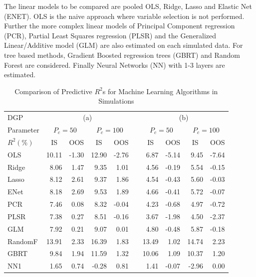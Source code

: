 \documentclass[]{article}
\begin{document}
The linear models to be compared are pooled OLS, Ridge, Lasso and
Elastic Net (ENET). OLS is the naive approach where variable selection
is not performed. Further the more complex linear models of Principal
Component regression (PCR), Partial Least Squares regression (PLSR) and
the Generalized Linear/Additive model (GLM) are also estimated on each
simulated data. For tree based methods, Gradient Boosted regression
trees (GBRT) and Random Forest are considered. Finally Neural Networks
(NN) with 1-3 layers are estimated.

\begin{table}[ht]
\begin{threeparttable}
\centering
\setlength{\tabcolsep}{12pt}
\caption{Comparison of Predictive $R^2$s for Machine Learning Algorithms in Simulations}
\begin{tabular}{lrrrrcrrrr}
DGP & \multicolumn{4}{c}{(a)} && \multicolumn{4}{c}{(b)} \\
  \Xhline{2\arrayrulewidth}\noalign{\smallskip}
Parameter & \multicolumn{2}{c}{$P_c = 50$} & \multicolumn{2}{c}{$P_c = 100$}& & \multicolumn{2}{c}{$P_c = 50$} &  \multicolumn{2}{c}{$P_c = 100$} \\
  \noalign{\smallskip}\hline\noalign{\smallskip}
$R^2(\%)$ & \multicolumn{1}{c}{IS} & \multicolumn{1}{c}{OOS} & \multicolumn{1}{c}{IS} & \multicolumn{1}{c}{OOS} & &\multicolumn{1}{c}{IS} & \multicolumn{1}{c}{OOS} & \multicolumn{1}{c}{IS} & \multicolumn{1}{c}{OOS} \\ 
  \noalign{\smallskip}\hline\noalign{\smallskip}
OLS & 10.11 & -1.30 & 12.90 & -2.76 && 6.87 & -5.14 & 9.45 & -7.64 \\ 
Ridge & 8.06 & 1.47 & 9.35 & 1.01 && 4.56 & -0.19 & 5.54 & -0.15 \\ 
Lasso & 8.12 & 2.61 & 9.37 & 1.86 && 4.54 & -0.43 & 5.60 & -0.03 \\ 
ENet & 8.18 & 2.69 & 9.53 & 1.89 && 4.66 & -0.41 & 5.72 & -0.07 \\ 
PCR & 7.46 & 0.08 & 8.32 & -0.04 && 4.23 & -0.68 & 4.97 & -0.72 \\ 
PLSR & 7.38 & 0.27 & 8.51 & -0.16 && 3.67 & -1.98 & 4.50 & -2.37 \\ 
GLM & 7.92 & 0.21 & 9.07 & 0.01 && 4.80 & -0.48 & 5.87 & -0.18 \\ 
RandomF & 13.91 & 2.33 & 16.39 & 1.83 && 13.49 & 1.02 & 14.74 & 2.23 \\ 
GBRT & 9.84 & 1.94 & 11.59 & 1.32 && 10.06 & 1.09 & 10.37 & 1.20 \\ 
NN1 & 1.65 & 0.74 & -0.28 & 0.81 && 1.41 & -0.07 & -2.96 & 0.00 \\ 

\end{tabular}
\end{threeparttable}
\end{table}
\end{document}
